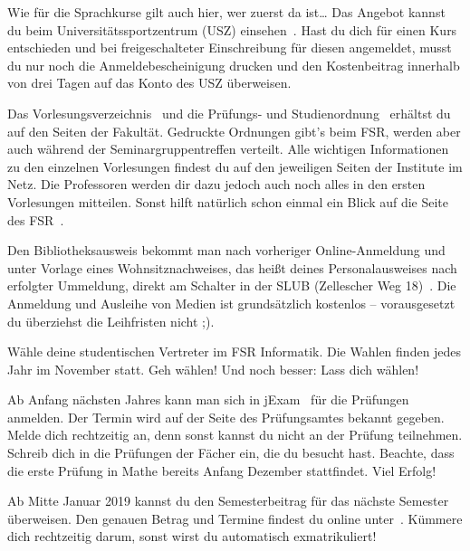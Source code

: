 \begin{itemize}[leftmargin=*]
Wie für die Sprachkurse gilt auch hier, wer zuerst da ist\ldots{} Das Angebot
kannst du beim Universitätssportzentrum (USZ) einsehen~. Hast du dich für einen Kurs entschieden und
bei freigeschalteter Einschreibung für diesen angemeldet, musst du nur noch die
Anmeldebescheinigung drucken und den Kostenbeitrag innerhalb von drei Tagen auf
das Konto des USZ überweisen.

Das Vorlesungsverzeichnis~ und die Prüfungs- und
Studienordnung~ erhältst du
auf den Seiten der Fakultät. Gedruckte Ordnungen gibt's beim FSR, werden aber auch während der Seminargruppentreffen verteilt.
Alle wichtigen Informationen zu den einzelnen Vorlesungen findest du
auf den jeweiligen Seiten der Institute im Netz.  Die Professoren werden dir
dazu jedoch auch noch alles in den ersten Vorlesungen mitteilen. Sonst hilft
natürlich schon einmal ein Blick auf die Seite des FSR~.

Den Bibliotheksausweis bekommt man nach vorheriger Online-Anmeldung und unter Vorlage eines
Wohnsitznachweises, das heißt deines Personalausweises nach erfolgter Ummeldung,
direkt am Schalter in der SLUB (Zellescher Weg 18)~. Die Anmeldung und Ausleihe
von Medien ist grundsätzlich kostenlos -- vorausgesetzt du überziehst die
Leihfristen nicht ;).

Wähle deine studentischen Vertreter im FSR Informatik. Die Wahlen finden jedes
Jahr im November statt. Geh wählen! Und noch besser: Lass dich wählen!

\pagebreak

Ab Anfang nächsten Jahres kann man sich in jExam~ für die Prüfungen anmelden.
Der Termin wird auf der Seite des Prüfungsamtes bekannt gegeben. Melde dich
rechtzeitig an, denn sonst kannst du nicht an der Prüfung teilnehmen. Schreib
dich in die Prüfungen der Fächer ein, die du besucht hast. Beachte, dass die
erste Prüfung in Mathe bereits Anfang Dezember stattfindet. Viel Erfolg!

Ab Mitte Januar 2019 kannst du den Semesterbeitrag für das nächste Semester
überweisen. Den genauen Betrag und Termine findest du online unter~. Kümmere dich rechtzeitig darum,
sonst wirst du automatisch exmatrikuliert!

\end{itemize}

